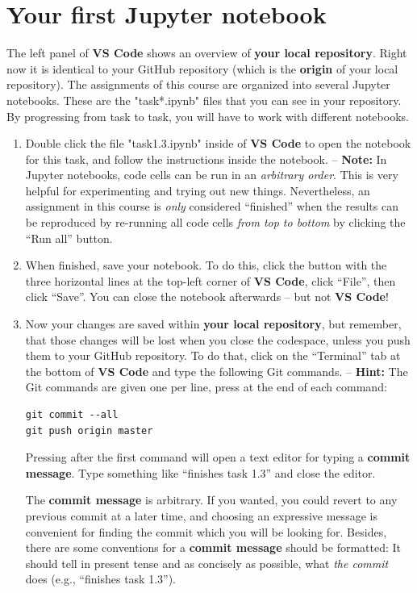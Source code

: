 \documentclass[12pt,a4paper]{article}
\begin{document}
\section{Your first Jupyter notebook}
The left panel of \textbf{VS Code} shows an overview of \textbf{your local repository}. Right now it is identical to your GitHub repository (which is the \textbf{origin} of your local repository). The assignments of this course are organized into several Jupyter notebooks. These are the "task*.ipynb" files that you can see in your repository. By progressing from task to task, you will have to work with different notebooks.

\begin{enumerate}
\item Double click the file "task1.3.ipynb" inside of \textbf{VS Code} to open the notebook for this task, and follow the instructions inside the notebook. -- \textbf{Note:} In Jupyter notebooks, code cells can be run in an \emph{arbitrary order}. This is very helpful for experimenting and trying out new things. Nevertheless, an assignment in this course is \emph{only} considered ``finished'' when the results can be reproduced by re-running all code cells \emph{from top to bottom} by clicking the ``Run all'' button.
\item When finished, save your notebook. To do this, click the button with the three horizontal lines at the top-left corner of \textbf{VS Code}, click ``File'', then click ``Save''. You can close the notebook afterwards -- but not \textbf{VS Code}!
\item Now your changes are saved within \textbf{your local repository}, but remember, that those changes will be lost when you close the codespace, unless you push them to your GitHub repository. To do that, click on the ``Terminal'' tab at the bottom of \textbf{VS Code} and type the following Git commands. -- \textbf{Hint:} The Git commands are given one per line, press \Return at the end of each command:
\begin{Verbatim}[frame=single]
git commit --all
git push origin master
\end{Verbatim}
Pressing \Return after the first command will open a text editor for typing a \textbf{commit message}. Type something like ``finishes task 1.3'' and close the editor.

The \textbf{commit message} is arbitrary. If you wanted, you could revert to any previous commit at a later time, and choosing an expressive message is convenient for finding the commit which you will be looking for. Besides, there are some conventions for a \textbf{commit message} should be formatted: It should tell in present tense and as concisely as possible, what \emph{the commit} does (e.g., ``finishes task 1.3'').
\end{enumerate}
\end{document}
